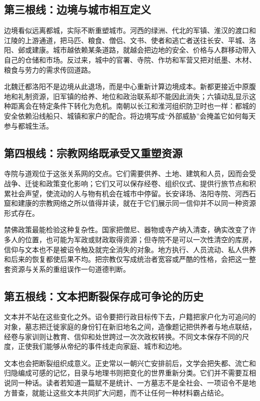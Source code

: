 \subsection{第三根线：边境与城市相互定义}

边境看似远离都城，实际不断重塑城市。河西的绿洲、代北的军镇、淮汉的渡口和江陵的上游通道，把马匹、粮食、僧侣、文书、使者和逃亡者送往长安、平城、洛阳、邺或建康。城市越依赖某条道路，就越会把边地的安全、价格与人群移动带入自己的仓储和市场。反过来，城中的官署、寺院、作坊和军营又把对纸墨、木材、粮食与劳力的需求传回道路。

北魏迁都洛阳不是边境从此退场，而是中心重新计算边境成本。新都更接近中原腹地和礼制资源，旧军镇的给养、地位和政治联系却不能因此消失；六镇动乱显示这种距离会在特定条件下转化为危机。南朝以长江和淮河组织防卫时也一样：都城的安全依赖沿线船只、城镇和家户的配合。将边境写成“外部威胁”会掩盖它如何每天参与都城生活。

\subsection{第四根线：宗教网络既承受又重塑资源}

寺院与道观位于这张关系网的交点。它们需要供养、土地、建筑和人员，因而会受战争、迁徙和政策变化影响；它们又可以保存经卷、组织仪式、提供行旅节点和积累社会声望，使流动的人与物有机会在城市中停留。长安译场、洛阳寺院、河西石窟和建康的宗教网络之所以值得并读，就在于它们展示同一信仰并不以同一种资源形式存在。

禁佛政策最能检验这种复杂性。国家把僧尼、器物或寺产纳入清查，确实改变了许多人的位置，也可能为军政或财政取得资源；但寺院不是可以一次性清空的库房，信仰与文本也不是被诏令触及就完全消失的对象。地方执行、人员流动、私人供养和后来的恢复都使后果不均。把宗教仅写成统治者宽容或严酷的性格，会把这一整套资源与关系的重组误作一句道德判断。

\subsection{第五根线：文本把断裂保存成可争论的历史}

文本并不站在这些变化之外。诏令要把行政目标传下去，户籍把家户化为可追问的对象，墓志把迁徙家庭的身份钉在新旧地名之间，造像题记把供养者与地点联结，经卷与家训则让教育、信仰和处世跨过一次次政权转换。不同文本保存不同的尺度，正使我们能够从帝纪的事件线走向家庭、城市和边地。

文本也会把断裂组织成意义。正史常以一朝兴亡安排前后，文学会把失都、流亡和归隐编成可感的记忆，目录与地理书则把变化的世界重新分类。它们并不需要互相说同一种话。读者若知道一篇赋不是统计、一方墓志不是全社会、一项诏令不是地方普查，就能让这些文本共同扩大问题，而不让任何一种材料霸占结论。

